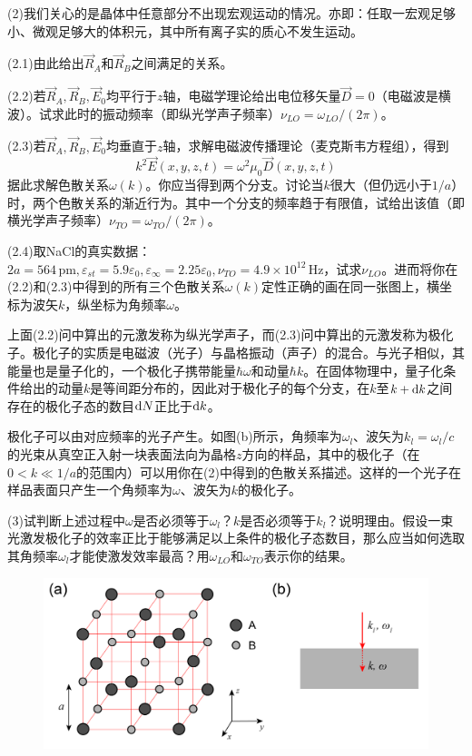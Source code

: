 \documentclass[11pt,a4paper,onecolumn,UTF8]{ctexart}
\begin{document}
	(2)我们关心的是晶体中任意部分不出现宏观运动的情况。亦即：任取一宏观足够小、微观足够大的体积元，其中所有离子实的质心不发生运动。
	
	(2.1)由此给出$\vec R_A$和$\vec R_B$之间满足的关系。
	
	(2.2)若$\vec R_A,\vec R_B,\vec E_0$均平行于$z$轴，电磁学理论给出电位移矢量$\vec D=0$（电磁波是横波）。试求此时的振动频率（即纵光学声子频率）$\nu_{LO}=\omega_{LO}/(2\pi)$。
	
	(2.3)若$\vec R_A,\vec R_B,\vec E_0$均垂直于$z$轴，求解电磁波传播理论（麦克斯韦方程组），得到
	\begin{equation*}
		k^2\vec{E}(x,y,z,t)=\omega^2\mu_0\vec{D}(x,y,z,t)
	\end{equation*}
	据此求解色散关系$\omega(k)$。你应当得到两个分支。讨论当$k$很大（但仍远小于$1/a$）时，两个色散关系的渐近行为。其中一个分支的频率趋于有限值，试给出该值（即横光学声子频率）$\nu_{TO}=\omega_{TO}/(2\pi)$。
	
	(2.4)取NaCl的真实数据：$2a=564\,\text{pm},\varepsilon_{st}=5.9\varepsilon_{0},\varepsilon_{\infty}=2.25\varepsilon_{0},\nu_{TO}=4.9\times10^{12}\,\text{Hz}$，试求$\nu_{LO}$。进而将你在(2.2)和(2.3)中得到的所有三个色散关系$\omega(k)$定性正确的画在同一张图上，横坐标为波矢$k$，纵坐标为角频率$\omega$。
	
	上面(2.2)问中算出的元激发称为纵光学声子，而(2.3)问中算出的元激发称为极化子。极化子的实质是电磁波（光子）与晶格振动（声子）的混合。与光子相似，其能量也是量子化的，一个极化子携带能量$\hbar\omega$和动量$\hbar k$。在固体物理中，量子化条件给出的动量$k$是等间距分布的，因此对于极化子的每个分支，在$k$至$k+\mathrm{d} k$之间存在的极化子态的数目$\mathrm{d} N$正比于$\mathrm{d} k$。
	
	极化子可以由对应频率的光子产生。如图(b)所示，角频率为$\omega_l$、波矢为$k_l=\omega_l/c$的光束从真空正入射一块表面法向为晶格$z$方向的样品，其中的极化子（在$0<k\ll1/a$的范围内）可以用你在(2)中得到的色散关系描述。这样的一个光子在样品表面只产生一个角频率为$\omega$、波矢为$k$的极化子。
	
	(3)试判断上述过程中$\omega$是否必须等于$\omega_l$？$k$是否必须等于$k_l$？说明理由。假设一束光激发极化子的效率正比于能够满足以上条件的极化子态数目，那么应当如何选取其角频率$\omega_l$才能使激发效率最高？用$\omega_{LO}$和$\omega_{TO}$表示你的结果。
	
	\begin{figure}[!bh]
		\centering
		\includegraphics[width=0.9\columnwidth]{3.png}
	\end{figure}
	
\end{document}
